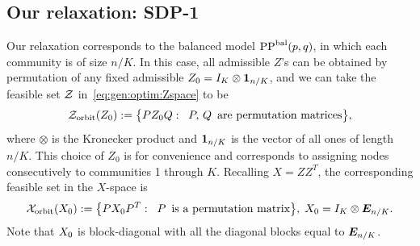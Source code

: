 \subsection{Our relaxation: SDP-1}
Our relaxation corresponds to the balanced model $\text{PP}^{\text{bal}}(p,q)$, in
which each community is of size $n/K$. In this case, all admissible
$Z$'s can be obtained by permutation of any fixed admissible $Z_0 = I_K  \otimes \bm{1}_{n/K}$, and we can take the feasible set $\mathcal{Z}$ in~\eqref{eq:gen:optim:Zspace} to be
\begin{align*}
  \mathcal{Z}_{\text{orbit}}{(}Z_0) := \big\{P Z_0 Q:\;  \;
    P, \,Q \, \text{ are permutation matrices}  \big\},
\end{align*}
 where $\otimes$ is the Kronecker product and $\bm{1}_{n/K}$ is the
 vector of all ones of length $n/K$. This choice of $Z_0$ is for
 convenience and corresponds to assigning nodes consecutively to
 communities 1 through $K$.    Recalling $X = ZZ^T$, the corresponding feasible set in the $X$-space is 
\begin{align}\label{eq:Xorbit}
  \mathcal{X}_{\text{orbit}}{(}X_0) := \big\{ P X_0 P^T: \; \; 
    P\,  \text{ is a permutation matrix} \big\}, \; X_0 = I_K \otimes \bm{E}_{n/K}.
\end{align}
Note that $X_0$ is block-diagonal with all the diagonal 
blocks equal to $\bm{E}_{n/K}$. 

